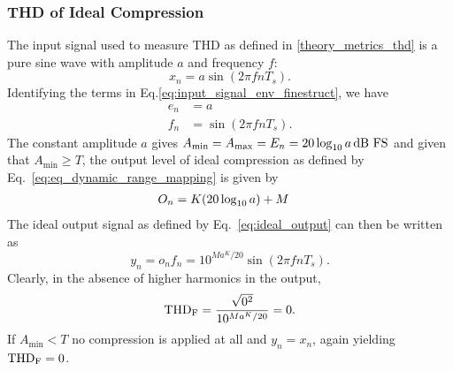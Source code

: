 \documentclass[../main2.tex]{subfiles}
\begin{document}
\subsubsection{THD of Ideal Compression}
The input signal used to measure THD as defined in \ref{theory_metrics_thd} is a pure sine wave with amplitude $a$ and frequency $f$:
\begin{equation}
x_n = a \sin( 2 \pi f n T_s ).
\end{equation}
Identifying the terms in Eq.\eqref{eq:input_signal_env_finestruct}, we have
\begin{equation}
\begin{split}
e_n &= a \\
f_n &= \sin( 2 \pi f n T_s ).
\end{split}
\end{equation}
The constant amplitude $a$ gives $A_\text{min} = A_\text{max} = E_n = 20 \log_{10} a \mskip3mu\text{dB FS}$ and given that $A_\text{min} \geq T$, the output level of ideal compression as defined by Eq.~\eqref{eq:eq_dynamic_range_mapping} is given by
\begin{equation}
\begin{split}
O_n &= K (20 \log_{10} a) + M
\end{split}
\end{equation}
The ideal output signal as defined by Eq.~\eqref{eq:ideal_output} can then be written as
\begin{equation}
y_n = o_n f_n = 10^{Ma^K/20} \sin(2 \pi f n T_s).
\end{equation}
Clearly, in the absence of higher harmonics in the output,
\begin{equation}
\text{THD}_\text{F} = \frac{\sqrt{0^2}}{10^{Ma^K/20}} = 0.
\end{equation}
If $A_\text{min} < T$ no compression is applied at all and $y_n = x_n$, again yielding $\text{THD}_\text{F} = 0$.

\end{document}
